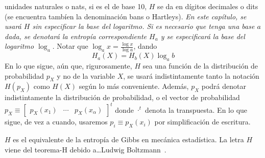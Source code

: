 unidades naturales o nats, si es el de base 10, $H$ se da en d\'igitos decimales
o dits (se encuentra tamb\'ien la denominaci\'on bans o Hartleys).  {\it En este
  cap\'itulo,  se usar\'a  $H$ sin  especificar la  base del  logaritmo.   Si es
  necesario  que  tenga   una  base  $a$  dada,  se   denotar\'a  la  entrop\'ia
  correspondiente  $H_a$ y se  especificar\'a la  base del  logaritmo $\log_a$}.
Notar que $\log_a x = \frac{\log x}{\log a}$, dando
%
\[
H_a(X)  =  H_b(X)  \log_a b
\]
%
En  lo  que  sigue, a\'un  que,  rigurosamente,  $H$  sea  una funci\'on  de  la
distribuci\'on  de  probabilidad $p_X$  y  no de  la  variable  $X$, se  usar\'a
indistintamente  tanto  la notaci\'on  $H(p_X)$  como  $H(X)$  seg\'un lo  m\'as
conveniente.  Adem\'as, $p_X$  podr\'a denotar indistintamente la distribuci\'on
de  probabilidad,  o  el  vector  de probabilidad  $p_X  \equiv  \begin{bmatrix}
  p_X(x_1) &  \cdots & p_X(x_\alpha) \end{bmatrix}^t$ donde  $\cdot^t$ denota la
transpuesta. En  lo que sigue, de  vez a cuando, usaremos  $p_i \equiv p_X(x_i)$
por simplificaci\'on de escritura.

$H$ es el equivalente de la entrop\'ia de Gibbs en mec\'anica estad\'istica.  La
letra  $H$  viene del  teorema-H  debido  a\ldots Ludwig  Boltzmann~\cite{Jay65,
  Mer10, Mer18}.


